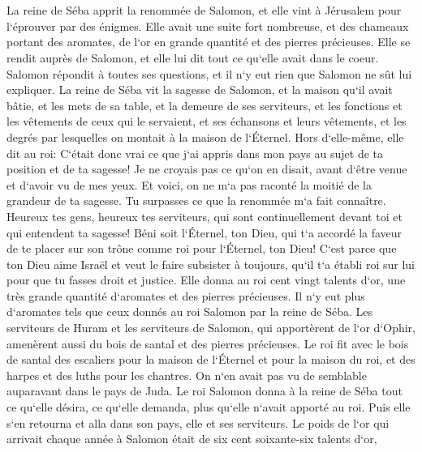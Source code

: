 \chapter{}

\verse La reine de Séba apprit la renommée de Salomon, et elle vint à Jérusalem pour l`éprouver par des énigmes. Elle avait une suite fort nombreuse, et des chameaux portant des aromates, de l`or en grande quantité et des pierres précieuses. Elle se rendit auprès de Salomon, et elle lui dit tout ce qu`elle avait dans le coeur. 
\verse Salomon répondit à toutes ses questions, et il n`y eut rien que Salomon ne sût lui expliquer. 
\verse La reine de Séba vit la sagesse de Salomon, et la maison qu`il avait bâtie, 
\verse et les mets de sa table, et la demeure de ses serviteurs, et les fonctions et les vêtements de ceux qui le servaient, et ses échansons et leurs vêtements, et les degrés par lesquelles on montait à la maison de l`Éternel. 
\verse Hors d`elle-même, elle dit au roi: C`était donc vrai ce que j`ai appris dans mon pays au sujet de ta position et de ta sagesse! 
\verse Je ne croyais pas ce qu`on en disait, avant d`être venue et d`avoir vu de mes yeux. Et voici, on ne m`a pas raconté la moitié de la grandeur de ta sagesse. Tu surpasses ce que la renommée m`a fait connaître. 
\verse Heureux tes gens, heureux tes serviteurs, qui sont continuellement devant toi et qui entendent ta sagesse! 
\verse Béni soit l`Éternel, ton Dieu, qui t`a accordé la faveur de te placer sur son trône comme roi pour l`Éternel, ton Dieu! C`est parce que ton Dieu aime Israël et veut le faire subsister à toujours, qu`il t`a établi roi sur lui pour que tu fasses droit et justice. 
\verse Elle donna au roi cent vingt talents d`or, une très grande quantité d`aromates et des pierres précieuses. Il n`y eut plus d`aromates tels que ceux donnés au roi Salomon par la reine de Séba. 
\verse Les serviteurs de Huram et les serviteurs de Salomon, qui apportèrent de l`or d`Ophir, amenèrent aussi du bois de santal et des pierres précieuses. 
\verse Le roi fit avec le bois de santal des escaliers pour la maison de l`Éternel et pour la maison du roi, et des harpes et des luths pour les chantres. On n`en avait pas vu de semblable auparavant dans le pays de Juda. 
\verse Le roi Salomon donna à la reine de Séba tout ce qu`elle désira, ce qu`elle demanda, plus qu`elle n`avait apporté au roi. Puis elle s`en retourna et alla dans son pays, elle et ses serviteurs. 
\verse Le poids de l`or qui arrivait chaque année à Salomon était de six cent soixante-six talents d`or, 
